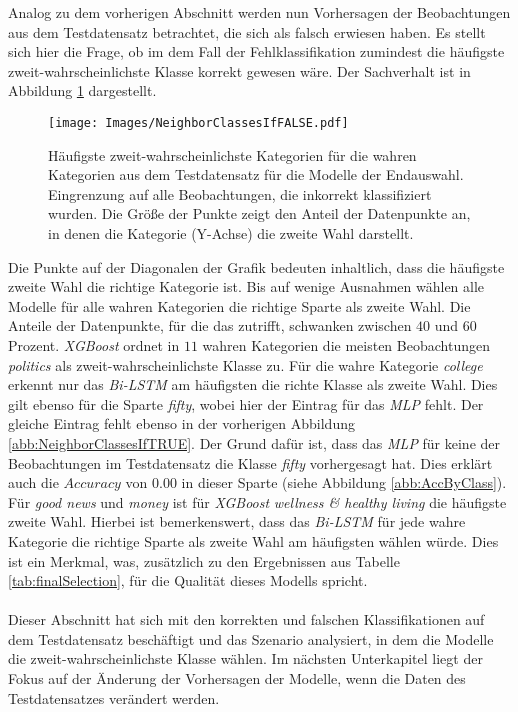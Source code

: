 \documentclass[a4paper,11pt]{article}
\begin{document}
Analog zu dem vorherigen Abschnitt werden nun Vorhersagen der Beobachtungen aus dem Testdatensatz betrachtet, die sich als falsch erwiesen haben. Es stellt sich hier die Frage, ob im dem Fall der Fehlklassifikation zumindest die häufigste zweit-wahrscheinlichste Klasse korrekt gewesen wäre. Der Sachverhalt ist in Abbildung \ref{abb:NeighborClassesIfFALSE} dargestellt.

\begin{figure}[ht]
    \centering
\texttt{[image: Images/NeighborClassesIfFALSE.pdf]} 
\caption{Häufigste zweit-wahrscheinlichste Kategorien für die wahren Kategorien aus dem Testdatensatz für die Modelle der Endauswahl. Eingrenzung auf alle Beobachtungen, die inkorrekt klassifiziert wurden. Die Größe der Punkte zeigt den Anteil der Datenpunkte an, in denen die Kategorie (Y-Achse) die zweite Wahl darstellt.}
\label{abb:NeighborClassesIfFALSE}
\end{figure}

Die Punkte auf der Diagonalen der Grafik bedeuten inhaltlich, dass die häufigste zweite Wahl die richtige Kategorie ist. Bis auf wenige Ausnahmen wählen alle Modelle für alle wahren Kategorien die richtige Sparte als zweite Wahl. Die Anteile der Datenpunkte, für die das zutrifft, schwanken zwischen $40$ und $60$ Prozent. \textit{XGBoost} ordnet in $11$ wahren Kategorien die meisten Beobachtungen \textit{politics} als zweit-wahrscheinlichste Klasse zu. Für die wahre Kategorie \textit{college} erkennt nur das \textit{Bi-LSTM} am häufigsten die richte Klasse als zweite Wahl. Dies gilt ebenso für die Sparte \textit{fifty}, wobei hier der Eintrag für das \textit{MLP} fehlt. Der gleiche Eintrag fehlt ebenso in der vorherigen Abbildung \ref{abb:NeighborClassesIfTRUE}. Der Grund dafür ist, dass das \textit{MLP} für keine der Beobachtungen im Testdatensatz die Klasse \textit{fifty} vorhergesagt hat. Dies erklärt auch die $Accuracy$ von $0.00$ in dieser Sparte (siehe Abbildung \ref{abb:AccByClass}). Für \textit{good news} und \textit{money} ist für \textit{XGBoost} \textit{wellness \& healthy living} die häufigste zweite Wahl. Hierbei ist bemerkenswert, dass das \textit{Bi-LSTM} für jede wahre Kategorie die richtige Sparte als zweite Wahl am häufigsten wählen würde. Dies ist ein Merkmal, was, zusätzlich zu den Ergebnissen aus Tabelle \ref{tab:finalSelection}, für die Qualität dieses Modells spricht.\\
\\
Dieser Abschnitt hat sich mit den korrekten und falschen Klassifikationen auf dem Testdatensatz beschäftigt und das Szenario analysiert, in dem die Modelle die zweit-wahrscheinlichste Klasse wählen. Im nächsten Unterkapitel liegt der Fokus auf der Änderung der Vorhersagen der Modelle, wenn die Daten des Testdatensatzes verändert werden.
\end{document}
